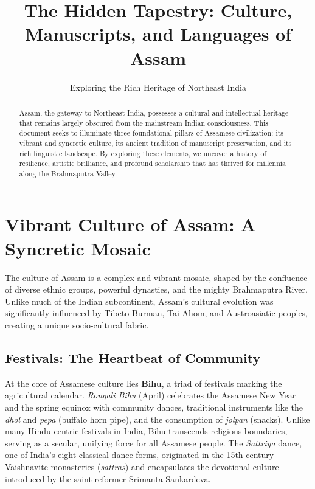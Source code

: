 \documentclass{article}
\title{The Hidden Tapestry: Culture, Manuscripts, and Languages of Assam}
\author{Exploring the Rich Heritage of Northeast India}
\date{}
\begin{document}
\maketitle

\begin{abstract}
Assam, the gateway to Northeast India, possesses a cultural and intellectual heritage that remains largely obscured from the mainstream Indian consciousness. This document seeks to illuminate three foundational pillars of Assamese civilization: its vibrant and syncretic culture, its ancient tradition of manuscript preservation, and its rich linguistic landscape. By exploring these elements, we uncover a history of resilience, artistic brilliance, and profound scholarship that has thrived for millennia along the Brahmaputra Valley.
\end{abstract}

\section{Vibrant Culture of Assam: A Syncretic Mosaic}
The culture of Assam is a complex and vibrant mosaic, shaped by the confluence of diverse ethnic groups, powerful dynasties, and the mighty Brahmaputra River. Unlike much of the Indian subcontinent, Assam's cultural evolution was significantly influenced by Tibeto-Burman, Tai-Ahom, and Austroasiatic peoples, creating a unique socio-cultural fabric.

\subsection{Festivals: The Heartbeat of Community}
At the core of Assamese culture lies \textbf{Bihu}, a triad of festivals marking the agricultural calendar. \textit{Rongali Bihu} (April) celebrates the Assamese New Year and the spring equinox with community dances, traditional instruments like the \textit{dhol} and \textit{pepa} (buffalo horn pipe), and the consumption of \textit{jolpan} (snacks). Unlike many Hindu-centric festivals in India, Bihu transcends religious boundaries, serving as a secular, unifying force for all Assamese people. The \textit{Sattriya} dance, one of India's eight classical dance forms, originated in the 15th-century Vaishnavite monasteries (\textit{sattras}) and encapsulates the devotional culture introduced by the saint-reformer Srimanta Sankardeva.
\end{document}
